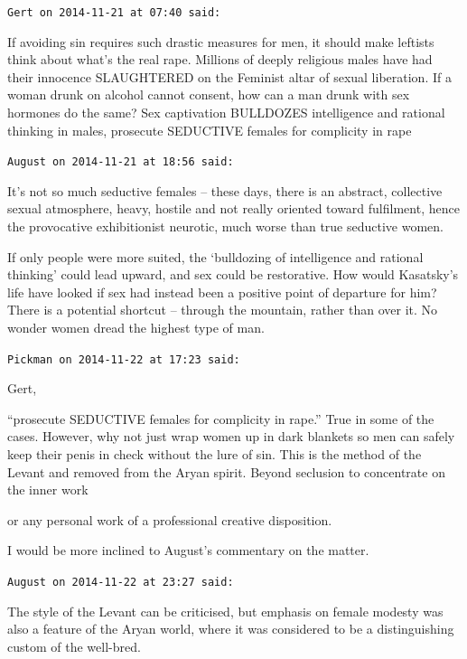\begin{footnotesize}
\begin{sffamily}
\texttt{Gert on 2014-11-21 at 07:40 said:}

If avoiding sin requires such drastic measures for men, it should make leftists think about what's the real rape. Millions of deeply religious males have had their innocence SLAUGHTERED on the Feminist altar of sexual liberation. If a woman drunk on alcohol cannot consent, how can a man drunk with sex hormones do the same? Sex captivation BULLDOZES intelligence and rational thinking in males, prosecute SEDUCTIVE females for complicity in rape

\hfill

\texttt{August on 2014-11-21 at 18:56 said:}

It's not so much seductive females -- these days, there is an abstract, collective sexual atmosphere, heavy, hostile and not really oriented toward fulfilment, hence the provocative exhibitionist neurotic, much worse than true seductive women.

If only people were more suited, the `bulldozing of intelligence and rational thinking' could lead upward, and sex could be restorative. How would Kasatsky's life have looked if sex had instead been a positive point of departure for him? There is a potential shortcut -- through the mountain, rather than over it. No wonder women dread the highest type of man.

\hfill

\texttt{Pickman on 2014-11-22 at 17:23 said:}

Gert,

``prosecute SEDUCTIVE females for complicity in rape.'' True in some of the cases. However, why not just wrap women up in dark blankets so men can safely keep their penis in check without the lure of sin. This is the method of the Levant and removed from the Aryan spirit. Beyond seclusion to concentrate on the inner work

or any personal work of a professional creative disposition.

I would be more inclined to August's commentary on the matter.

\hfill

\texttt{August on 2014-11-22 at 23:27 said:}

The style of the Levant can be criticised, but emphasis on female modesty was also a feature of the Aryan world, where it was considered to be a distinguishing custom of the well-bred.


\end{sffamily}
\end{footnotesize}
